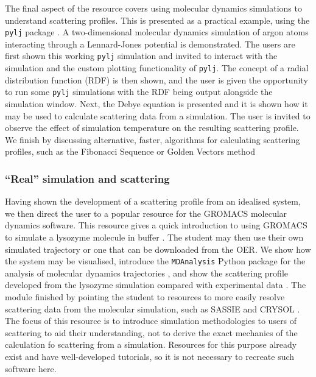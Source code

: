 The final aspect of the resource covers using molecular dynamics simulations to understand scattering profiles.
This is presented as a practical example, using the \texttt{pylj} package \cite{mccluskey_pylj_2018,mccluskey_arm61/pylj_2019-2}.
A two-dimensional molecular dynamics simulation of argon atoms interacting through a Lennard-Jones potential is demonstrated.
The users are first shown this working \texttt{pylj} simulation and invited to interact with the simulation and the custom plotting functionality of \texttt{pylj}.
The concept of a radial distribution function (RDF) is then shown, and the user is given the opportunity to run some \texttt{pylj} simulations with the RDF being output alongside the simulation window.
Next, the Debye equation \cite{debye_zerstreuung_1915} is presented and it is shown how it may be used to calculate scattering data from a simulation.
The user is invited to observe the effect of simulation temperature on the resulting scattering profile.
We finish by discussing alternative, faster, algorithms for calculating scattering profiles, such as the Fibonacci Sequence or Golden Vectors method \cite{watson_rapid_2013,svergun_solution_1994}

\subsubsection{``Real'' simulation and scattering}

Having shown the development of a scattering profile from an idealised system, we then direct the user to a popular resource for the GROMACS \cite{berendsen_gromacs_1995} molecular dynamics software.
This resource gives a quick introduction to using GROMACS to simulate a lysozyme molecule in buffer \cite{lemkul_gromacs_nodate}.
The student may then use their own simulated trajectory or one that can be downloaded from the OER.
We show how the system may be visualised, introduce the \texttt{MDAnalysis} Python package for the analysis of molecular dynamics trajectories \cite{michaud-agrawal_mdanalysis_2011,gowers_mdanalysis_2016}, and show the scattering profile developed from the lysozyme simulation compared with experimental data \cite{franke_correlation_2015}.
The module finished by pointing the student to resources to more easily resolve scattering data from the molecular simulation, such as SASSIE and CRYSOL \cite{perkins_atomistic_2016,svergun_crysol_1995}.
The focus of this resource is to introduce simulation methodologies to users of scattering to aid their understanding, not to derive the exact mechanics of the calculation fo scattering from a simulation.
Resources for this purpose already exist and have well-developed tutorials, so it is not necessary to recreate such software here.

